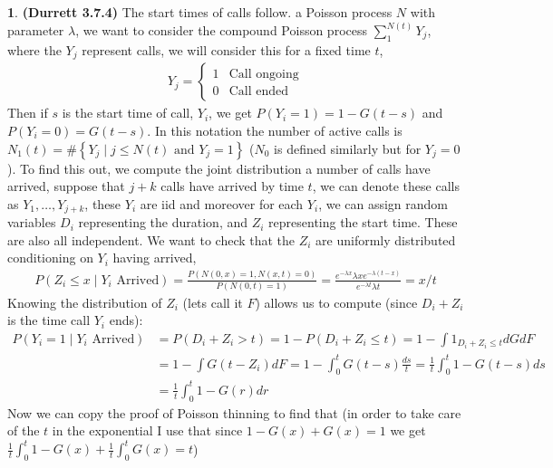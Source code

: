 \documentclass{article}
\theoremstyle{definition}
\newtheorem{pb}{}
\newcommand{\set}[1]{\left\{#1\right\}}
\newcommand{\tand}{\text{ and }}
\begin{document}
    \begin{pb}\textbf{(Durrett 3.7.4)}
        The start times of calls follow. a Poisson process \(N\) with parameter \(\lambda\), we want to consider the compound Poisson process \(\sum_1^{N(t)} Y_j\), where the \(Y_j\) represent calls, we will consider this for a fixed time \(t\),
        \begin{align*}
            Y_j = \begin{cases}
                1 & \text{Call ongoing} \\
                0 & \text{Call ended}
            \end{cases}
        \end{align*}
        Then if \(s\) is the start time of call, \(Y_i\), we get \(P(Y_i = 1) = 1 - G(t-s)\) and \(P(Y_i = 0) = G(t-s)\). In this notation the number of active calls is \(N_1(t) = \#\set{Y_j \mid j \leq N(t) \tand Y_j = 1}\) (\(N_0\) is defined similarly but for \(Y_j = 0\)). To find this out, we compute the joint distribution a number of calls have arrived, suppose that \(j+k\) calls have arrived by time \(t\), we can denote these calls as \(Y_1,\hdots, Y_{j+k}\), these \(Y_i\) are iid and moreover for each \(Y_i\), we can assign random variables \(D_i\) representing the duration, and \(Z_i\) representing the start time. These are also all independent. We want to check that the \(Z_i\) are uniformly distributed conditioning on \(Y_i\) having arrived,
        \begin{align*}
            P(Z_i \leq x \mid Y_i \text{ Arrived}) = \frac{P(N(0,x) = 1, N(x,t) = 0)}{P(N(0,t) = 1)} = \frac{e^{-\lambda x}\lambda x e^{-\lambda(t-x)}}{e^{-\lambda t}\lambda t} = x/t
        \end{align*}
        Knowing the distribution of \(Z_i\) (lets call it \(F\)) allows us to compute (since \(D_i + Z_i\) is the time call \(Y_i\) ends):
        \begin{align*}
            P(Y_i = 1 \mid Y_i \text{ Arrived}) &= P(D_i+Z_i > t) = 1 - P(D_i + Z_i \leq t) = 1 - \int 1_{D_i+Z_i \leq t} dG dF\\
            &= 1 - \int G(t - Z_i) dF
            = 1 - \int_0^t G(t - s) \frac{ds}{t} = \frac{1}{t}\int_0^t 1 - G(t-s)ds \\ 
            &= \frac{1}{t}\int_0^t 1 - G(r)dr
        \end{align*}
        Now we can copy the proof of Poisson thinning to find that (in order to take care of the \(t\) in the exponential I use that since \(1- G(x) + G(x) = 1\) we get \(\frac{1}{t}\int_0^t 1-G(x) + \frac{1}{t}\int_0^tG(x) = t\))

\end{pb}
\end{document}
